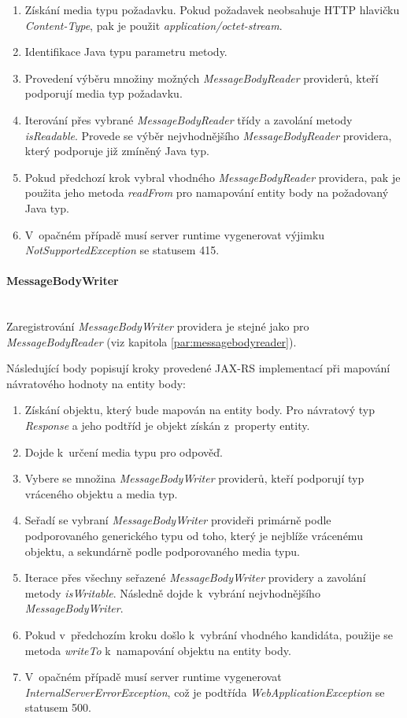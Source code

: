 \documentclass[11pt,twoside,a4paper]{book}
\begin{document}
\begin{enumerate}
  \item Získání media typu požadavku. Pokud požadavek neobsahuje HTTP hlavičku
{\em Content-Type}, pak je použit {\em application/octet-stream}.
  \item Identifikace Java typu parametru metody.
  \item Provedení výběru množiny možných {\em MessageBodyReader} providerů,
  kteří podporují media typ požadavku.
  \item Iterování přes vybrané {\em MessageBodyReader} třídy a zavolání metody
  {\em isReadable}.
Provede se výběr nejvhodnějšího {\em MessageBodyReader} providera, který
podporuje již zmíněný Java typ.
  \item Pokud předchozí krok vybral vhodného {\em MessageBodyReader} providera,
  pak je použita jeho metoda {\em readFrom} pro namapování entity body na
  požadovaný Java typ.
  \item V~opačném případě musí server runtime vygenerovat výjimku {\em
  NotSupportedException} se statusem 415.
\end{enumerate}

\paragraph{MessageBodyWriter}
\mbox{}\\

Zaregistrování {\em MessageBodyWriter} providera je stejné jako pro
{\em MessageBodyReader} (viz kapitola \ref{par:messagebodyreader}).

Následující body popisují kroky provedené JAX-RS implementací při mapování
návratového hodnoty na entity body:

\begin{enumerate}
  \item Získání objektu, který bude mapován na entity body. Pro návratový typ {\em Response} a
jeho podtříd je objekt získán z~property entity.
  \item Dojde k~určení media typu pro odpověď.
  \item Vybere se množina {\em MessageBodyWriter} providerů, kteří podporují typ
  vráceného objektu a media typ.
  \item Seřadí se vybraní {\em MessageBodyWriter} provideři primárně podle
  podporovaného generického typu od toho, který je nejblíže vrácenému objektu, a
  sekundárně podle podporovaného media typu.
  \item Iterace přes všechny seřazené {\em MessageBodyWriter} providery a
  zavolání metody {\em isWritable}. Následně dojde k~vybrání nejvhodnějšího
  {\em MessageBodyWriter}.
  \item Pokud v~předchozím kroku došlo k~vybrání vhodného kandidáta, použije se
metoda {\em writeTo} k~namapování objektu na entity body.
  \item V~opačném případě musí server runtime vygenerovat {\em
  InternalServerErrorException}, což je podtřída {\em WebApplicationException}
  se statusem 500.
\end{enumerate}
\end{document}

